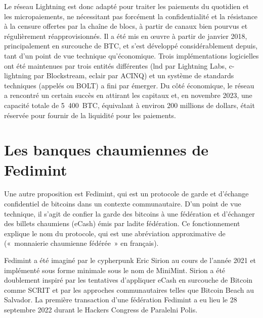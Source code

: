 Le réseau Lightning est donc adapté pour traiter les paiements du quotidien et les micropaiements, ne nécessitant pas forcément la confidentialité et la résistance à la censure offertes par la chaîne de blocs, à partir de canaux bien pourvus et régulièrement réapprovisionnés. Il a été mis en œuvre à partir de janvier 2018, principalement en surcouche de BTC, et s'est développé considérablement depuis, tant d'un point de vue technique qu'économique. Trois implémentations logicielles ont été maintenues par trois entités différentes (lnd par Lightning Labs, c-lightning par Blockstream, eclair par ACINQ) et un système de standards techniques (appelés  ou BOLT) a fini par émerger. Du côté économique, le réseau a rencontré un certain succès en attirant les capitaux et, en novembre 2023, une capacité totale de 5~400~BTC, équivalant à environ 200 millions de dollars, était réservée pour fournir de la liquidité pour les paiements.

\section*{Les banques chaumiennes de Fedimint}

Une autre proposition est Fedimint, qui est un protocole de garde et d'échange confidentiel de bitcoins dans un contexte communautaire. D'un point de vue technique, il s'agit de confier la garde des bitcoins à une fédération et d'échanger des billets chaumiens (eCash) émis par ladite fédération. Ce fonctionnement explique le nom du protocole, qui est une abréviation approximative de  («~monnaierie chaumienne fédérée~» en français).

Fedimint a été imaginé par le cypherpunk Eric Sirion au cours de l'année 2021 et implémenté sous forme minimale sous le nom de MiniMint. Sirion a été doublement inspiré par les tentatives d'appliquer eCash en surcouche de Bitcoin comme SCRIT et par les approches communautaires telles que Bitcoin Beach au Salvador. La première transaction d'une fédération Fedimint a eu lieu le 28 septembre 2022 durant le Hackers Congress de Paralelni Polis.

